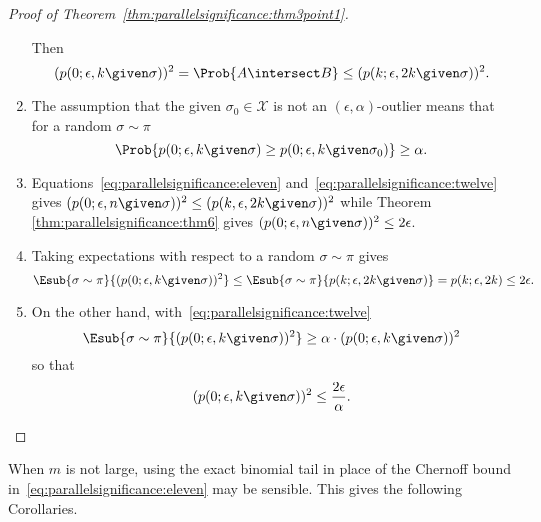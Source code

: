 \documentclass[12pt]{article}
\begin{document}
\begin{proof}[Proof of Theorem~\ref{thm:parallelsignificance:thm3point1}]
\begin{enumerate}
            Then
            \begin{equation}
                \label{eq:parallelsignificance:eleven} (p(0; \epsilon, k \given
                \sigma))^2 = \Prob{ A \intersect B} \le (p(k; \epsilon,
                2k \given \sigma))^2.
            \end{equation}
        \item
            The assumption that the given \( \sigma_0 \in \mathcal{X} \)
            is not an \( (\epsilon, \alpha) \)-outlier means that for a
            random \( \sigma \sim \pi \)
            \begin{equation}
                \label{eq:parallelsignificance:twelve} \Prob{ p(0; \epsilon, k
                \given \sigma) \ge p(0; \epsilon, k \given \sigma_0) }
                \ge \alpha.
            \end{equation}
        \item
            Equations~\eqref{eq:parallelsignificance:eleven} and~\eqref{eq:parallelsignificance:twelve}
            gives \( (p(0; \epsilon, n \given \sigma))^2 \le (p(k,
            \epsilon, 2k \given \sigma))^2 \) while Theorem~%
            \ref{thm:parallelsignificance:thm6} gives \( (p(0; \epsilon, n
            \given \sigma))^2 \le 2\epsilon \).
        \item
            Taking expectations with respect to a random \( \sigma \sim
            \pi \) gives
            \[
                \Esub{\sigma \sim \pi}{(p(0; \epsilon, k \given \sigma))^2
                } \le \Esub{\sigma \sim \pi}{p(k; \epsilon, 2k \given
                \sigma) } = p(k; \epsilon, 2k) \le 2\epsilon.
            \]
        \item
            On the other hand, with~\eqref{eq:parallelsignificance:twelve}
            \[
                \Esub{\sigma \sim \pi}{(p(0; \epsilon, k \given \sigma))^2
                } \ge \alpha \cdot (p(0; \epsilon, k \given \sigma))^2
            \] so that
            \[
                (p(0; \epsilon, k \given \sigma))^2 \le \frac{2\epsilon}
                {\alpha}.
            \]
    \end{enumerate}
\end{proof}

\begin{remark}
    When \( m \) is not large, using the exact binomial tail in place of
    the Chernoff bound in~\eqref{eq:parallelsignificance:eleven} may be
    sensible.  This gives the following Corollaries.
\end{remark}
\end{document}
